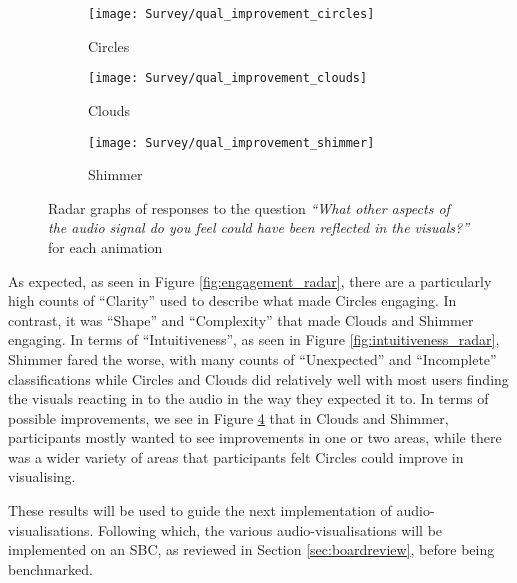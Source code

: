 \documentclass[../initial_thesis.tex]{subfiles}
\begin{document}
\begin{figure}
  \begin{subfigure}{0.5\textwidth}
    \centering
    \texttt{[image: Survey/qual\_improvement\_circles]}
    \caption{Circles}
    \label{fig:improvement_circles}
  \end{subfigure}
  \begin{subfigure}{0.5\textwidth}
    \centering
    \texttt{[image: Survey/qual\_improvement\_clouds]}
    \caption{Clouds}
    \label{fig:improvement_clouds}
  \end{subfigure}
  \begin{subfigure}{0.5\textwidth}
    \centering
    \texttt{[image: Survey/qual\_improvement\_shimmer]}
    \caption{Shimmer}
    \label{fig:improvement_shimmer}
  \end{subfigure}
  \caption{Radar graphs of responses to the question \textit{``What other aspects of the audio signal do you feel could have been reflected in the visuals?''} for each animation}
  \label{fig:improvement_radar}
\end{figure}

As expected, as seen in Figure \ref{fig:engagement_radar}, there are a particularly high counts of ``Clarity'' used to describe what made Circles engaging. In contrast, it was ``Shape'' and ``Complexity'' that made Clouds and Shimmer engaging. In terms of ``Intuitiveness'', as seen in Figure \ref{fig:intuitiveness_radar}, Shimmer fared the worse, with many counts of ``Unexpected'' and ``Incomplete'' classifications while Circles and Clouds did relatively well with most users finding the visuals reacting in to the audio in the way they expected it to. In terms of possible improvements, we see in Figure \ref{fig:improvement_radar} that in Clouds and Shimmer, participants mostly wanted to see improvements in one or two areas, while there was a wider variety of areas that participants felt Circles could improve in visualising. \par

These results will be used to guide the next implementation of audio-visualisations. Following which, the various audio-visualisations will be implemented on an SBC, as reviewed in Section \ref{sec:boardreview}, before being benchmarked. 
\end{document}
